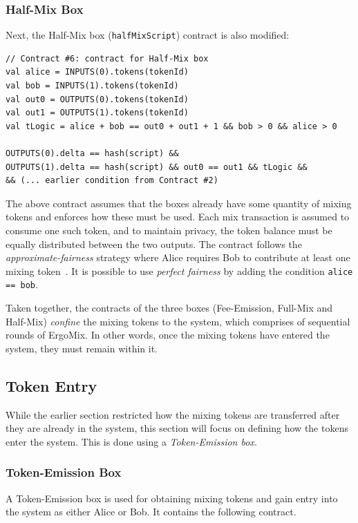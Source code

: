 \documentclass[runningheads]{llncs}
\newcommand{\mixname}{ErgoMix\xspace}
\begin{document}
\subsubsection{Half-Mix Box}
Next, the Half-Mix box (\texttt{halfMixScript}) contract is also modified:
{\small
\begin{Verbatim}[frame=single]
// Contract #6: contract for Half-Mix box
val alice = INPUTS(0).tokens(tokenId)
val bob = INPUTS(1).tokens(tokenId)
val out0 = OUTPUTS(0).tokens(tokenId)
val out1 = OUTPUTS(1).tokens(tokenId)
val tLogic = alice + bob == out0 + out1 + 1 && bob > 0 && alice > 0 
  
OUTPUTS(0).delta == hash(script) && 
OUTPUTS(1).delta == hash(script) && out0 == out1 && tLogic &&
&& (... earlier condition from Contract #2)
\end{Verbatim}
}

The above contract assumes that the boxes already have some quantity of mixing tokens and enforces how these must be used. Each mix transaction is assumed to consume one such token, and to maintain privacy, the token balance must be equally distributed between the two outputs. The contract follows the {\em approximate-fairness} strategy where Alice requires Bob to contribute at least one mixing token~\cite{advtutorial}. It is possible to use {\em perfect fairness} by adding the condition \texttt{alice == bob}. 

Taken together, the contracts of the three boxes (Fee-Emission, Full-Mix and Half-Mix) {\em confine} the mixing tokens to the system, which comprises of sequential rounds of \mixname. In other words, once the mixing tokens have entered the system, they must remain within it. 

\subsection{Token Entry}

While the earlier section restricted how the mixing tokens are transferred after they are already in the system, this section will focus on defining how the tokens enter the system. This is done using a {\em Token-Emission box}. 

\subsubsection{Token-Emission Box}

A Token-Emission box is used for obtaining mixing tokens and gain entry into the system as either Alice or Bob. It contains the following contract. 
\end{document}
